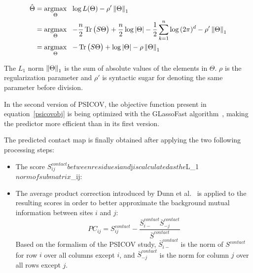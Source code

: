         \begin{equation} \label{psicovobj}
            \begin{split}
                \hat{\Theta} & = \argmax_{\Theta} \ \ \log{L}(\Theta) - \rho' \norm{\Theta}_1 \\
                & = \argmax_{\Theta} \ \ -\frac{n}{2} \trace\big(S \Theta\big) + \frac{n}{2} \log{\vert\Theta\vert}
                    - \frac{1}{2} \sum\limits_{k=1}^{n} \log{(2\pi)^d} - \rho' \norm{\Theta}_1 \\
                & = \argmax_{\Theta} \ \ -\trace\big(S \Theta\big) + \log{\vert\Theta\vert} - \rho \norm{\Theta}_1 \\
            \end{split}
        \end{equation}

        The $L_1$ norm $\left\lVert\Theta\right\rVert_1$ is the sum of absolute values of the elements in $\Theta$.
        $\rho$ is the regularization parameter and $\rho'$ is syntactic sugar for denoting the same
        parameter before division.

        In the second version of PSICOV, the objective function present in equation~\ref{psicovobj} is being
        optimized with the GLassoFast algorithm~\cite{sustik2012glassofast}, making the predictor more efficient
        than in its first version.

        The predicted contact map is finally obtained after applying the two following processing steps:
        \begin{itemize}
            \item The score $S_{ij}^{contact} between residues $i$ and $j$ is calculated as
                the $L_1$ norm of submatrix $\Theta_{ij}:
            \item The average product correction introduced by Dunn et al.~\cite{dunn2007mutual}
                is applied to the resulting scores in order to better approximate the background
                mutual information between sites $i$ and $j$:
                \begin{equation}
                    PC_{ij} = S_{ij}^{contact} - \frac{\bar{S}_{i-}^{contact} \bar{S}_{-j}^{contact}}{\bar{S}^{contact}}
                \end{equation}
                Based on the formalism of the PSICOV study, $\bar{S}_{i-}^{contact}$ is the norm of $S^{contact}$ for row $i$
                over all columns except $i$, and $\bar{S}_{-j}^{contact}$ is the norm for column $j$ over all rows except $j$.
        \end{itemize}

